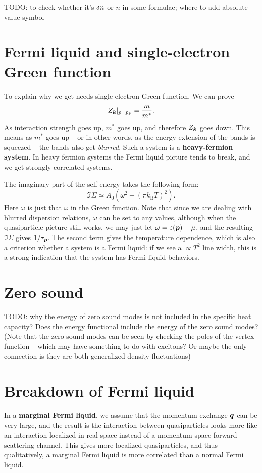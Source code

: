 \documentclass[hyperref, a4paper]{article}
\newcommand*{\concept}[1]{{\textbf{#1}}}
\newcommand*{\kB}{k_{\text{B}}}
\newcommand*{\pfermi}{p_{\text{F}}}
\begin{document}
TODO: to check whether it's $\var{n}$ or $n$ in some formulae; 
where to add absolute value symbol

\section{Fermi liquid and single-electron Green function}

To explain why we get  
needs single-electron Green function.
We can prove 
\begin{equation}
    Z_{\vb*{k}}|_{p = \pfermi} = \frac{m}{m^*}.
\end{equation}
As interaction strength goes up, $m^*$ goes up, 
and therefore $Z_{\vb*{k}}$ goes down.
This means as $m^*$ goes up -- or in other words, 
as the energy extension of the bands is squeezed -- 
the bands also get \emph{blurred}.
Such a system is a \concept{heavy-fermion system}.
In heavy fermion systems the Fermi liquid picture tends to break,
and we get strongly correlated systems.

The imaginary part of the self-energy takes the following form: 
\begin{equation}
    \Im \Sigma \simeq A_0 (\omega^2 + (\pi \kB T)^2).
\end{equation}
Here $\omega$ is just that $\omega$ in the Green function.
Note that since we are dealing with blurred dispersion relations, 
$\omega$ can be set to any values, 
although when the quasiparticle picture still works, 
we may just let $\omega = \varepsilon(\vb*{p}) - \mu$, 
and the resulting $\Im \Sigma$ gives $1 / {\tau_{\vb*{p}}}$.
The second term gives the temperature dependence,
which is also a criterion whether a system is a Fermi liquid: 
if we see a $\propto T^2$ line width,
this is a strong indication that the system 
has Fermi liquid behaviors.

\section{Zero sound}

TODO: why the energy of zero sound modes is not included in the specific heat capacity?
Does the energy functional include the energy of the zero sound modes?
(Note that the zero sound modes can be seen by checking the poles of the vertex function 
-- which may have something to do with excitons? 
Or maybe the only connection is they are both generalized density fluctuations)

\section{Breakdown of Fermi liquid}

In a \concept{marginal Fermi liquid}, 
we assume that the momentum exchange $\vb*{q}$ can be very large, 
and the result is the interaction between quasiparticles 
looks more like an interaction localized in real space 
instead of a momentum space forward scattering channel.
This gives more localized quasiparticles,
and thus qualitatively, 
a marginal Fermi liquid is more correlated than 
a normal Fermi liquid.
\end{document}
